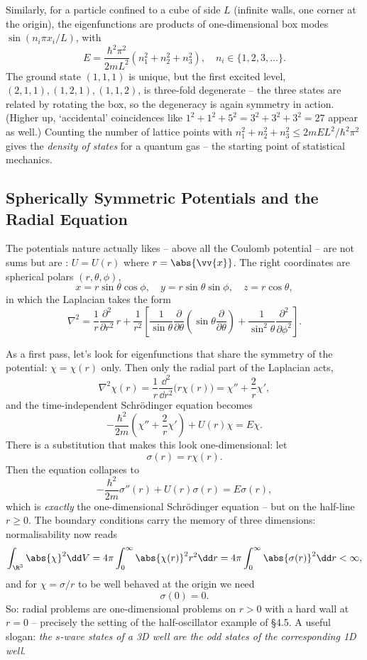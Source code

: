 \begin{example}
    Similarly, for a particle confined to a cube of side $L$ (infinite walls, one corner at the origin), the eigenfunctions are products of one-dimensional box modes $\sin(n_i \pi x_i / L)$, with
    $$
    E = \frac{\hbar^2 \pi^2}{2 m L^2} \left( n_1^2 + n_2^2 + n_3^2 \right), \quad n_i \in \{1, 2, 3, \dots\}.
    $$
    The ground state $(1,1,1)$ is unique, but the first excited level, $(2,1,1), (1,2,1), (1,1,2)$, is three-fold degenerate -- the three states are related by rotating the box, so the degeneracy is again symmetry in action. (Higher up, `accidental' coincidences like $1^2 + 1^2 + 5^2 = 3^2 + 3^2 + 3^2 = 27$ appear as well.) Counting the number of lattice points with $n_1^2 + n_2^2 + n_3^2 \leq 2mEL^2/\hbar^2\pi^2$ gives the \emph{density of states} for a quantum gas -- the starting point of statistical mechanics.
\end{example}

\subsection{Spherically Symmetric Potentials and the Radial Equation}

The potentials nature actually likes -- above all the Coulomb potential -- are not sums but are : $U = U(r)$ where $r = \abs{\vv{x}}$. The right coordinates are spherical polars $(r, \theta, \phi)$,
$$
x = r \sin\theta\cos\phi, \quad y = r \sin\theta \sin\phi, \quad z = r \cos\theta,
$$
in which the Laplacian takes the form
$$
\nabla^2 = \frac{1}{r} \frac{\partial^2}{\partial r^2} \, r + \frac{1}{r^2} \left[ \frac{1}{\sin \theta} \frac{\partial}{\partial \theta} \left( \sin \theta \frac{\partial}{\partial \theta} \right) + \frac{1}{\sin^2 \theta} \frac{\partial^2}{\partial \phi^2} \right].
$$

As a first pass, let's look for eigenfunctions that share the symmetry of the potential: $\chi = \chi(r)$ only. Then only the radial part of the Laplacian acts,
$$
\nabla^2 \chi(r) = \frac{1}{r}\frac{\dd^2}{\dd r^2}\big( r \chi(r) \big) = \chi'' + \frac{2}{r}\chi',
$$
and the time-independent Schr\"odinger equation becomes
$$
-\frac{\hbar^2}{2m} \left( \chi'' + \frac{2}{r}\chi' \right) + U(r) \chi = E \chi.
$$
There is a substitution that makes this look one-dimensional: let
$$
\sigma(r) = r \chi(r).
$$
Then the equation collapses to
$$
-\frac{\hbar^2}{2m} \sigma''(r) + U(r) \sigma(r) = E \sigma(r),
$$
which is \emph{exactly} the one-dimensional Schr\"odinger equation -- but on the half-line $r \geq 0$. The boundary conditions carry the memory of three dimensions: normalisability now reads
$$
\int_{\R^3} \abs{\chi}^2 \dd V = 4\pi \int_0^\infty \abs{\chi(r)}^2 r^2 \dd r = 4 \pi \int_0^\infty \abs{\sigma(r)}^2 \dd r < \infty,
$$
and for $\chi = \sigma / r$ to be well behaved at the origin we need
$$
\sigma(0) = 0.
$$
So: radial problems are one-dimensional problems on $r > 0$ with a hard wall at $r = 0$ -- precisely the setting of the half-oscillator example of \S 4.5. A useful slogan: \emph{the $s$-wave states of a 3D well are the odd states of the corresponding 1D well}.

